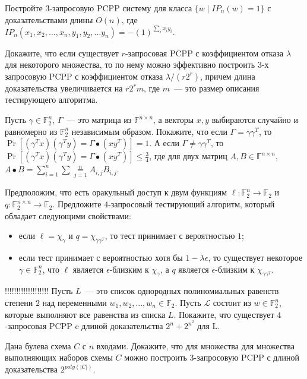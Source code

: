 \begin{task}
	Постройте $3$-запросовую PCPP систему для класса $\{w \mid IP_n(w) = 1\}$ с доказательствами длины $O(n)$, где $IP_n(x_1, x_2,
    \dots, x_n, y_1, y_2,\dots y_n) = -(1)^{\sum\limits_i x_i y_i}$.
\end{task}


\begin{task}
    Докажите, что если существует $r$-запросовая PCPP с коэффициентом отказа $\lambda$ для некоторого множества, то по нему можно
    эффективно построить $3$-х запросовую PCPP с коэффициентом отказа $\lambda / (r 2^r)$, причем длина доказательства
    увеличивается на $r 2^rm$, где $m$~--- это размер описания тестирующего алгоритма.
\end{task}

\begin{task}
    Пусть $\gamma \in \mathbb{F}_2^n$, $\Gamma$~--- это матрица из $\mathbb{F}^{n \times n}$, а векторы $x, y$ выбираются случайно
    и равномерно из $\mathbb{F}_2^n$ независимым образом. Покажите, что если $\Gamma = \gamma \gamma^T$, то
    $\Pr[(\gamma^T x) (\gamma^T y) = \Gamma \bullet (x y^T)] = 1$. А если $\Gamma \neq \gamma \gamma^T$, то
    $\Pr[(\gamma^T x) (\gamma^T y) = \Gamma \bullet (x y^T)] \le \frac{3}{4}$, где для двух матриц $A, B \in
    \mathbb{F}^{n \times n}$, $A \bullet B = \sum\limits_{i = 1}^n \sum=\limits_{j = 1}^n A_{i, j} B_{i, j}$.
\end{task}


\begin{task}
	Предположим, что есть оракульный доступ к двум функциям $\ell: \mathbb{F}_2^n \to \mathbb{F}_2$ и
    $q: \mathbb{F}_2^{n \times n} \to \mathbb{F}_2$. Предложите $4$-запросовый тестирующий алгоритм, который обладает следующими
    свойствами:
    \begin{itemize}
        \item если $\ell = \chi_{\gamma}$ и $q = \chi_{\gamma \gamma^T}$, то тест принимает с вероятностью $1$;
        \item если тест принимает с вероятностью хотя бы $1 - \lambda \epsilon$, то существует некоторое $\gamma \in
			\mathbb{F}_2^n$, что $\ell$ является $\epsilon$-близким к $\chi_\gamma$, а $q$ является $\epsilon$-близким к $\chi_{\gamma \gamma^T}$.
    \end{itemize}
\end{task}


\begin{task}{!!!!!!!!!!!!!!!!!!!}
    Пусть $L$~--- это список однородных полиномиальных равенств степени $2$ над переменными $w_1, w_2, \dots, w_n \in
    \mathbb{F}_2$. Пусть $\mathcal{L}$ состоит из $w \in \mathbb{F}_2^n$, которые выполняют все равенства из списка $L$. Покажите,
    что существует $4$-запросовая PCPP c длиной доказательства $2^n + 2^{n^2}$ для L.
\end{task}


\begin{task}
    Дана булева схема $C$ с $n$ входами. Докажите, что для множества для множества выполняющих наборов схемы $C$ можно построить
    $3$-запросовую PCPP с длиной доказательства $2^{poly (|C|)}$.
\end{task}


